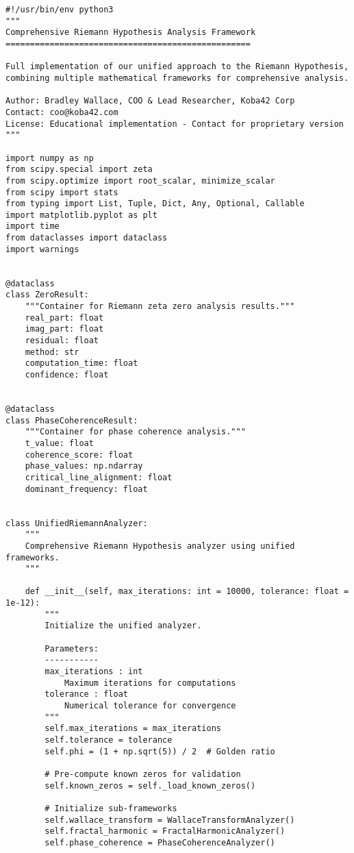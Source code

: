 \documentclass[12pt]{article}
\begin{document}
\begin{lstlisting}
#!/usr/bin/env python3
"""
Comprehensive Riemann Hypothesis Analysis Framework
==================================================

Full implementation of our unified approach to the Riemann Hypothesis,
combining multiple mathematical frameworks for comprehensive analysis.

Author: Bradley Wallace, COO & Lead Researcher, Koba42 Corp
Contact: coo@koba42.com
License: Educational implementation - Contact for proprietary version
"""

import numpy as np
from scipy.special import zeta
from scipy.optimize import root_scalar, minimize_scalar
from scipy import stats
from typing import List, Tuple, Dict, Any, Optional, Callable
import matplotlib.pyplot as plt
import time
from dataclasses import dataclass
import warnings


@dataclass
class ZeroResult:
    """Container for Riemann zeta zero analysis results."""
    real_part: float
    imag_part: float
    residual: float
    method: str
    computation_time: float
    confidence: float


@dataclass
class PhaseCoherenceResult:
    """Container for phase coherence analysis."""
    t_value: float
    coherence_score: float
    phase_values: np.ndarray
    critical_line_alignment: float
    dominant_frequency: float


class UnifiedRiemannAnalyzer:
    """
    Comprehensive Riemann Hypothesis analyzer using unified frameworks.
    """

    def __init__(self, max_iterations: int = 10000, tolerance: float = 1e-12):
        """
        Initialize the unified analyzer.

        Parameters:
        -----------
        max_iterations : int
            Maximum iterations for computations
        tolerance : float
            Numerical tolerance for convergence
        """
        self.max_iterations = max_iterations
        self.tolerance = tolerance
        self.phi = (1 + np.sqrt(5)) / 2  # Golden ratio

        # Pre-compute known zeros for validation
        self.known_zeros = self._load_known_zeros()

        # Initialize sub-frameworks
        self.wallace_transform = WallaceTransformAnalyzer()
        self.fractal_harmonic = FractalHarmonicAnalyzer()
        self.phase_coherence = PhaseCoherenceAnalyzer()


\end{lstlisting}
\end{document}
